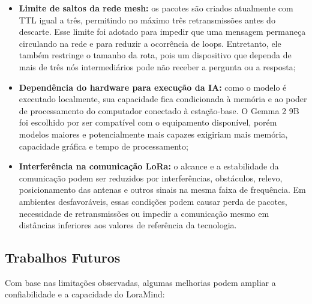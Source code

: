 \documentclass[12pt]{article}
\begin{document}
\begin{itemize}
    \item \textbf{Limite de saltos da rede mesh:} os pacotes são criados atualmente com TTL igual a três, permitindo no máximo três retransmissões antes do descarte. Esse limite foi adotado para impedir que uma mensagem permaneça circulando na rede e para reduzir a ocorrência de loops. Entretanto, ele também restringe o tamanho da rota, pois um dispositivo que dependa de mais de três nós intermediários pode não receber a pergunta ou a resposta;

    \item \textbf{Dependência do hardware para execução da IA:} como o modelo é executado localmente, sua capacidade fica condicionada à memória e ao poder de processamento do computador conectado à estação-base. O Gemma 2 9B foi escolhido por ser compatível com o equipamento disponível, porém modelos maiores e potencialmente mais capazes exigiriam mais memória, capacidade gráfica e tempo de processamento;

    \item \textbf{Interferência na comunicação LoRa:} o alcance e a estabilidade da comunicação podem ser reduzidos por interferências, obstáculos, relevo, posicionamento das antenas e outros sinais na mesma faixa de frequência. Em ambientes desfavoráveis, essas condições podem causar perda de pacotes, necessidade de retransmissões ou impedir a comunicação mesmo em distâncias inferiores aos valores de referência da tecnologia.
\end{itemize}

\subsection{Trabalhos Futuros}

Com base nas limitações observadas, algumas melhorias podem ampliar a confiabilidade e a capacidade do LoraMind:
\end{document}
